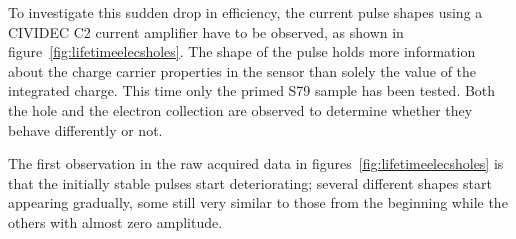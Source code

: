 

To investigate this sudden drop in efficiency, the current pulse shapes using a CIVIDEC C2 current amplifier have to be observed, as shown in figure~\ref{fig:lifetimeelecsholes}. The shape of the pulse holds more information about the charge carrier properties in the sensor than solely the value of the integrated charge. This time only the primed S79 sample has been tested. Both the hole and the electron collection are observed to determine whether they behave differently or not. 

The first observation in the raw acquired data in figures~\ref{fig:lifetimeelecsholes} is that the initially stable pulses start deteriorating; several different shapes start appearing gradually, some still very similar to those from the beginning while the others with almost zero amplitude. 

